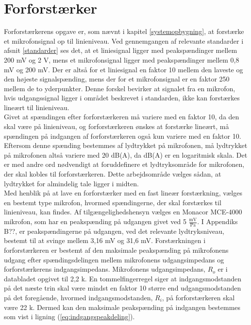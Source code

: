 \chapter{Forforstærker}
\label{forforstaerker}
Forforstærkerens opgave er, som nævnt i kapitel \ref{systemopbygning}, at forstærke et mikrofonsignal op til linieniveau. Ved gennemgangen af relevante standarder i afsnit \ref{standarder} ses det, at et liniesignal ligger med peakspændinger mellem 200 mV og 2 V, mens et mikrofonsignal ligger med peakspændinger mellem 0,8 mV og 200 mV. Der er altså for et liniesignal en faktor 10 mellem den laveste og den højeste signalspænding, mens der for et mikrofonsignal er en faktor 250 mellem de to yderpunkter. Denne forskel bevirker at signalet fra en mikrofon, hvis udgangssignal ligger i området beskrevet i standarden, ikke kan forstærkes lineært til linieniveau.\\ 
Givet at spændingen efter forforstærkeren må variere med en faktor 10, da den skal være på linieniveau, og forforstærkeren ønskes at forstærke lineært, må spændingen på indgangen af forforstærkeren også kun variere med en faktor 10. Eftersom denne spænding bestemmes af lydtrykket på mikrofonen, må lydtrykket på mikrofonen altså variere med 20 dB(A), da dB(A) er en logaritmisk skala. Det er med andre ord nødvendigt at foruddefinere et lydtryksområde for mikrofonen, der skal kobles til forforstærkeren. Dette arbejdsområde vælges sådan, at lydtrykket for almindelig tale ligger i midten. \\
Med henblik på at lave en forforstærker med en fast lineær forstærkning, vælges en bestemt type mikrofon, hvormed spændingerne, der skal forstærkes til linieniveau, kan findes. Af tilgængelighedshensyn vælges en Monacor MCE-4000 mikrofon, som har en peakspænding på udgangen givet ved 5 $\mathrm{\tfrac{mV}{Pa}}$. I Appendiks B??, er peakspændingerne på udgangen, ved det relevante lydtryksniveau, bestemt til at svinge mellem 3,16 mV og 31,6 mV. Forstærkningen i forforstærkeren er bestemt af den maksimale peakspænding på mikrofonens udgang efter spændingsdelingen mellem mikrofonens udgangsimpedans og forforstærkerens indgangsimpedans. Mikrofonens udgangsimpedans, $R_o$ er i databladet \cite{mic-datablad} opgivet til 2,2 k\ohm. En tommelfingerregel siger at indgangsmodstanden på det næste trin skal være mindst en faktor 10 større end udgangsmodstanden på det foregående, hvormed indgangsmodstanden, $R_i$, på forforstærkeren skal være 22 k\ohm. Dermed kan den maksimale peakspænding på indgangen bestemmes som vist i ligning (\ref{eq:indgangspeakdeling}).

